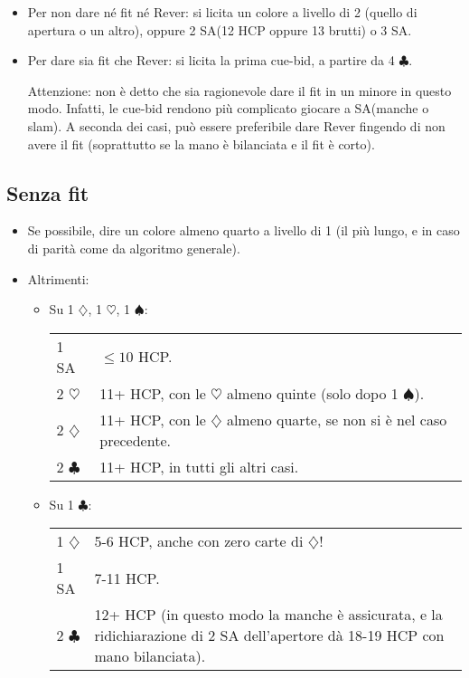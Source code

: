 \documentclass[a4paper,10pt]{article}
\renewcommand{\c}{$\clubsuit$\xspace}
\renewcommand{\d}{$\diamondsuit$\xspace}
\newcommand{\h}{$\heartsuit$\xspace}
\newcommand{\s}{$\spadesuit$\xspace}
\newcommand{\sa}{SA\xspace}
\newcommand{\smallspace}{\vskip0.3cm}
\newenvironment{twocol}
  {\smallspace\noindent\begin{tabular}{l p{0.78\textwidth}}}
  {\end{tabular}\smallspace}
\begin{document}
\begin{itemize}
\begin{itemize}
  \item Per non dare né fit né Rever: si licita un colore a livello di 2 (quello di apertura o un altro), oppure 2 \sa (12 HCP oppure 13 brutti) o 3 \sa.
  
  \item Per dare sia fit che Rever: si licita la prima cue-bid, a partire da 4 \c.
  
  Attenzione: non è detto che sia ragionevole dare il fit in un minore in questo modo. Infatti, le cue-bid rendono più complicato giocare a \sa (manche o slam). A seconda dei casi, può essere preferibile dare Rever fingendo di non avere il fit (soprattutto se la mano è bilanciata e il fit è corto).
 \end{itemize}

\end{itemize}


\subsection{Senza fit}

\begin{itemize}
 \item Se possibile, dire un colore almeno quarto a livello di 1 (il più lungo, e in caso di parità come da algoritmo generale).
 \item Altrimenti:
 \begin{itemize}
  \item Su 1 \d, 1 \h, 1 \s:
  \begin{twocol}
    1 \sa & $\leq 10$ HCP.\\
    2 \h & 11+ HCP, con le \h almeno quinte (solo dopo 1 \s).\\
    2 \d & 11+ HCP, con le \d almeno quarte, se non si è nel caso precedente.\\
    2 \c & 11+ HCP, in tutti gli altri casi.\\
  \end{twocol}
  \item Su 1 \c:
  \begin{twocol}
    1 \d & 5-6 HCP, anche con zero carte di \d!\\
    1 \sa & 7-11 HCP.\\
    2 \c & 12+ HCP (in questo modo la manche è assicurata, e la ridichiarazione di 2 \sa dell'apertore dà 18-19 HCP con mano bilanciata).\\
   \end{twocol}
 \end{itemize}
\end{itemize}
\end{document}
